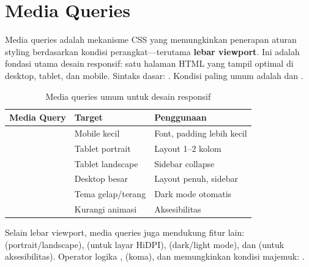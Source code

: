 ﻿\section{Media Queries}

Media queries adalah mekanisme CSS yang memungkinkan penerapan aturan styling berdasarkan kondisi perangkat---terutama \textbf{lebar viewport}. Ini adalah fondasi utama desain responsif: satu halaman HTML yang tampil optimal di desktop, tablet, dan mobile. Sintaks dasar: . Kondisi paling umum adalah  dan  \cite{mdnCss}.

\begin{table}[H]
\centering
\begin{tabular}{|P{4.5cm}|P{3cm}|P{4.5cm}|}
\hline
\textbf{Media Query} & \textbf{Target} & \textbf{Penggunaan} \\
\hline
{} & Mobile kecil & Font, padding lebih kecil \\
\hline
{} & Tablet portrait & Layout 1--2 kolom \\
\hline
{} & Tablet landscape & Sidebar collapse \\
\hline
{} & Desktop besar & Layout penuh, sidebar \\
\hline
{} & Tema gelap/terang & Dark mode otomatis \\
\hline
{} & Kurangi animasi & Aksesibilitas \\
\hline
\end{tabular}
\caption{Media queries umum untuk desain responsif}
\end{table}

Selain lebar viewport, media queries juga mendukung fitur lain:  (portrait/landscape),  (untuk layar HiDPI),  (dark/light mode), dan  (untuk aksesibilitas). Operator logika ,  (koma), dan  memungkinkan kondisi majemuk:  \cite{webdevCss}.


